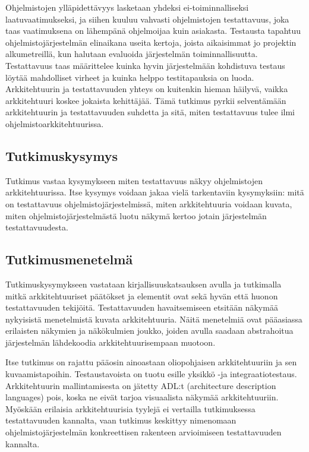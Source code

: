 \documentclass[finnish]{tktltiki2}
\theoremstyle{definition}
\theoremstyle{remark}
\begin{document}
Ohjelmistojen ylläpidettävyys lasketaan yhdeksi ei-toiminnalliseksi laatuvaatimukseksi, ja siihen kuuluu vahvasti ohjelmistojen testattavuus, joka taas vaatimuksena on lähempänä ohjelmoijaa kuin asiakasta. Testausta tapahtuu ohjelmistojärjestelmän elinaikana useita kertoja, joista  aikaisimmat jo projektin alkumetreillä, kun halutaan evaluoida järjestelmän toiminnallisuutta. Testattavuus taas määrittelee kuinka hyvin järjestelmään kohdistuva testaus löytää mahdolliset virheet ja kuinka helppo testitapauksia on luoda. Arkkitehtuurin ja testattavuuden yhteys on kuitenkin hieman häilyvä, vaikka arkkitehtuuri koskee jokaista kehittäjää. Tämä tutkimus pyrkii selventämään arkkitehtuurin ja testattavuuden suhdetta ja sitä, miten testattavuus tulee ilmi ohjelmistoarkkitehtuurissa. 

\subsection{Tutkimuskysymys}
Tutkimus vastaa kysymykseen miten testattavuus näkyy ohjelmistojen arkkitehtuurissa. Itse kysymys voidaan jakaa vielä tarkentaviin kysymyksiin: mitä on testattavuus ohjelmistojärjestelmissä, miten arkkitehtuuria voidaan kuvata, miten ohjelmistojärjestelmästä luotu näkymä kertoo jotain järjestelmän testattavuudesta. 

\subsection{Tutkimusmenetelmä}
Tutkimuskysymykseen vastataan kirjallisuuskatsauksen avulla ja tutkimalla mitkä arkkitehtuuriset päätökset ja elementit ovat sekä hyvän että huonon testattavuuden tekijöitä. Testattavuuden havaitsemiseen etsitään näkymää nykyisistä menetelmistä kuvata arkkitehtuuria. Näitä menetelmiä ovat pääasiassa erilaisten näkymien ja näkökulmien joukko, joiden avulla saadaan abstrahoitua järjestelmän lähdekoodia arkkitehtuurisempaan muotoon.

Itse tutkimus on rajattu pääosin ainoastaan oliopohjaisen arkkitehtuuriin ja sen kuvaamistapoihin. Testaustavoista on tuotu esille yksikkö -ja integraatiotestaus. Arkkitehtuurin mallintamisesta on jätetty ADL:t (architecture description languages) pois, koska ne eivät tarjoa visuaalista näkymää arkkitehtuuriin. Myöskään erilaisia arkkitehtuurisia tyylejä ei vertailla tutkimuksessa testattavuuden kannalta, vaan tutkimus keskittyy nimenomaan ohjelmistojärjestelmän konkreettisen rakenteen arvioimiseen testattavuuden kannalta.
\end{document}
